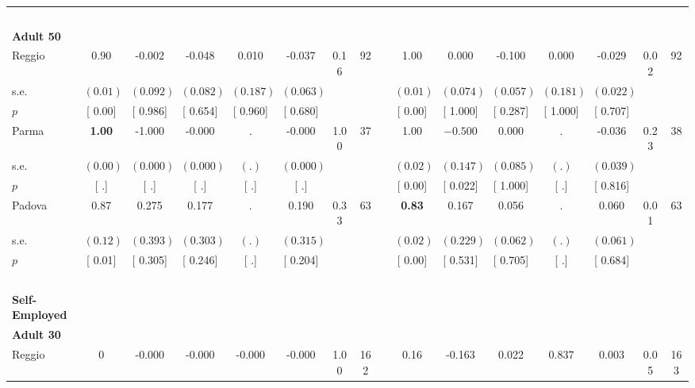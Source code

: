 \begin{longtable}{L{8em} c c c c c c c p{1em} c c c c c c c}
~\\[1em]
\quad \quad \textbf{Adult 50} & & & & & & & & & & & & & & & \\* 
\quad \quad \quad Reggio& 0.90 &    -0.002 &    -0.048 &     0.010 &    -0.037 &      0.16 &        92 & & 1.00 &     0.000 &    -0.100 &     0.000 &    -0.029 &      0.02 &        92  \\*
\quad \quad \quad \quad s.e.& $ (     0.01)$ & $ (    0.092)$ & $ (    0.082)$ & $ (    0.187)$ & $ (    0.063)$ & & & & $ (     0.01)$ & $ (    0.074)$ & $ (    0.057)$ & $ (    0.181)$ & $ (    0.022)$ & &  \\*
\quad \quad \quad \quad $ p$ & [     0.00] & [    0.986] & [    0.654] & [    0.960] & [    0.680] & & & & [     0.00] & [    1.000] & [    0.287] & [    1.000] & [    0.707] & &  \\[1em]
\quad \quad \quad Parma& \textbf{     1.00} &    -1.000 &    -0.000 &         . &    -0.000 &      1.00 &        37 & & 1.00 & $ \mathbf{   -0.500}$ &     0.000 &         . &    -0.036 &      0.23 &        38  \\*
\quad \quad \quad \quad s.e.& $ (     0.00)$ & $ (    0.000)$ & $ (    0.000)$ & $ (        .)$ & $ (    0.000)$ & & & & $ (     0.02)$ & $ (    0.147)$ & $ (    0.085)$ & $ (        .)$ & $ (    0.039)$ & &  \\*
\quad \quad \quad \quad $ p$ & [        .] & [        .] & [        .] & [        .] & [        .] & & & & [     0.00] & [    0.022] & [    1.000] & [        .] & [    0.816] & &  \\[1em]
\quad \quad \quad Padova& 0.87 &     0.275 &     0.177 &         . &     0.190 &      0.33 &        63 & & \textbf{     0.83} &     0.167 &     0.056 &         . &     0.060 &      0.01 &        63  \\*
\quad \quad \quad \quad s.e.& $ (     0.12)$ & $ (    0.393)$ & $ (    0.303)$ & $ (        .)$ & $ (    0.315)$ & & & & $ (     0.02)$ & $ (    0.229)$ & $ (    0.062)$ & $ (        .)$ & $ (    0.061)$ & &  \\*
\quad \quad \quad \quad $ p$ & [     0.01] & [    0.305] & [    0.246] & [        .] & [    0.204] & & & & [     0.00] & [    0.531] & [    0.705] & [        .] & [    0.684] & &  \\[1em]
~\\[1em]
\textbf{Self-Employed} \\*
\quad \quad \textbf{Adult 30} & & & & & & & & & & & & & & & \\* 
\quad \quad \quad Reggio& 0 &    -0.000 &    -0.000 &    -0.000 &    -0.000 &      1.00 &       162 & & 0.16 &    -0.163 &     0.022 & $ \mathbf{    0.837}$ &     0.003 &      0.05 &       163  \\*

\end{longtable}
